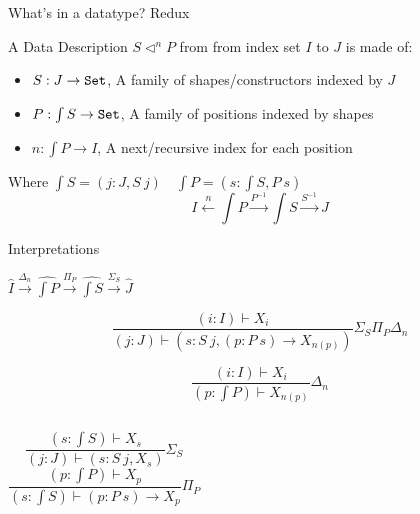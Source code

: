 \documentclass{beamer}
\newcommand{\Set}{{\tt Set }}
\begin{document}
\begin{frame}[fragile]{What's in a datatype? Redux}
\begin{definition}[Description]
A \alert{Data Description} $S \triangleleft^n P$ from from index set $I$ to $J$ is made of:
\begin{itemize}
\item[]  $S : J \to \Set$, A family of \alert{shapes/constructors} indexed by $J$
\item[]  $P : \int S \to \Set$, A family of \alert{positions} indexed by shapes
\item[] $n : \int P \to I$, A \alert{next/recursive} index for each position
\end{itemize}
\end{definition}
Where $\int S = (j : J, S~j) \quad \int P = (s : \int S, P~s)$
\pause
\[I \xleftarrow{n} \int P \xrightarrow{P^{-1}} \int S \xrightarrow{S^{-1}} J\]
\end{frame}

\begin{frame}{Interpretations}
\begin{center}
$\hat I \xrightarrow{\Delta_n} \hat{ \int P} \xrightarrow{\Pi_P} \hat{\int S} \xrightarrow{\Sigma_S} \hat J$
\end{center}
\[\frac{(i : I) \vdash X_i}{(j : J) \vdash (s : S~j, (p : P~s) \to X_{n(p)})} \Sigma_S \Pi_P \Delta_n\]
\hrulefill

\pause
\[\frac{(i : I) \vdash X_i}{(p : \int P) \vdash X_{n(p)}} \Delta_n\]
\begin{columns}
\[\frac{(s : \int S) \vdash X_s}{(j : J) \vdash (s : S~j, X_s)} \Sigma_S\]
\[\frac{(p : \int P) \vdash X_p}{(s : \int S) \vdash (p : P~s) \to  X_p} \Pi_P\]
\end{columns}

\end{frame}
\end{document}
